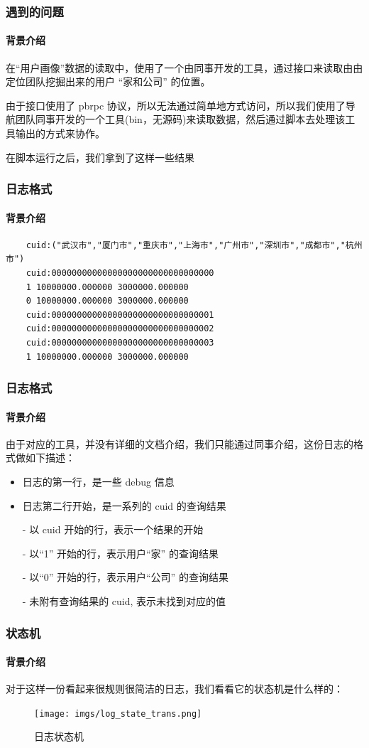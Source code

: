 \begin{frame}[fragile]
  \frametitle{遇到的问题}
  \framesubtitle{背景介绍}

  在“用户画像”数据的读取中，使用了一个由同事开发的工具，通过接口来读取由由定位团队挖掘出来的用户 “家和公司” 的位置。 
  \vspace{\baselineskip}

  由于接口使用了  pbrpc 协议，所以无法通过简单地方式访问，所以我们使用了导航团队同事开发的一个工具(bin，无源码)来读取数据，然后通过脚本去处理该工具输出的方式来协作。 
  \vspace{\baselineskip}

  \pause
  在脚本运行之后，我们拿到了这样一些结果

\end{frame}

\begin{frame}[fragile]
  \frametitle{日志格式}
  \framesubtitle{背景介绍}
  \begin{verbatim}
    cuid:("武汉市","厦门市","重庆市","上海市","广州市","深圳市","成都市","杭州市")
    cuid:00000000000000000000000000000000
    1 10000000.000000 3000000.000000
    0 10000000.000000 3000000.000000
    cuid:00000000000000000000000000000001
    cuid:00000000000000000000000000000002
    cuid:00000000000000000000000000000003
    1 10000000.000000 3000000.000000
  \end{verbatim}
\end{frame}

\begin{frame}[fragile]
  \frametitle{日志格式}
  \framesubtitle{背景介绍}
  由于对应的工具，并没有详细的文档介绍，我们只能通过同事介绍，这份日志的格式做如下描述：

  
  \begin{itemize}
  \item 日志的第一行，是一些 debug 信息
  \item 日志第二行开始，是一系列的 cuid 的查询结果
  \item[-] 以 cuid 开始的行，表示一个结果的开始
  \item[-] 以``1'' 开始的行，表示用户``家'' 的查询结果
  \item[-] 以``0'' 开始的行，表示用户``公司'' 的查询结果
  \item[-] 未附有查询结果的 cuid, 表示未找到对应的值
  \end{itemize}
\end{frame}

\begin{frame}[fragile]
  \frametitle{状态机}
  \framesubtitle{背景介绍}
  对于这样一份看起来很规则很简洁的日志，我们看看它的状态机是什么样的： \pause
  \begin{figure}[htbp]
    \centering
    \texttt{[image: imgs/log\_state\_trans.png]}
    \caption{日志状态机}
    \label{fig:loc-trans}
  \end{figure}
\end{frame}

